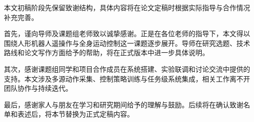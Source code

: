 
\begin{acknowledgements}

本文初稿阶段先保留致谢结构，具体内容将在论文定稿时根据实际指导与合作情况补充完善。

首先，谨向导师及课题组老师致以诚挚感谢。正是在各位老师的指导下，本文得以围绕人形机器人遥操作与全身运动控制这一课题逐步展开。导师在研究选题、技术路线和论文写作方面给予的帮助，将在正式版本中进一步具体说明。

其次，感谢课题组同学和项目合作成员在系统搭建、实验联调和讨论交流中提供的支持。本文涉及多源动作采集、控制策略训练与任务级系统集成，相关工作离不开团队协作与持续迭代。

最后，感谢家人与朋友在学习和研究期间给予的理解与鼓励。后续将在确认致谢名单和表述后，将本节替换为正式定稿内容。

\end{acknowledgements}

